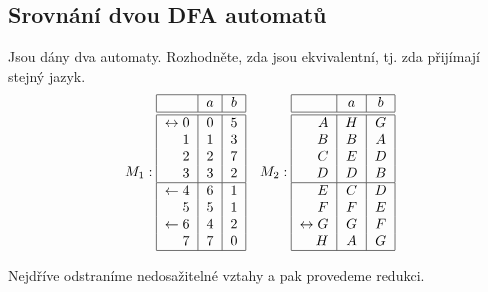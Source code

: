 \subsection{Srovnání dvou DFA automatů}
Jsou dány dva automaty. Rozhodněte, zda jsou ekvivalentní, tj. zda přijímají stejný jazyk.
\[
M_1:
\begin{tabular}{|r|c|c|}
    \hline
    & $a$ & $b$\\
    \hline
    \hline
    $\leftrightarrow 0$& $0$ & $5$\\
    $1$                & $1$ & $3$\\
    $2$                & $2$ & $7$\\
    $3$                & $3$ & $2$\\
    \hline
    $\leftarrow 4$     & $6$ & $1$\\
    $5$                & $5$ & $1$\\
    $\leftarrow 6$     & $4$ & $2$\\
    $7$                & $7$ & $0$\\
    \hline
\end{tabular}
\quad
M_2:
\begin{tabular}{|r|c|c|}
    \hline
    & $a$ & $b$\\
    \hline
    \hline
    $A$                & $H$ & $G$\\
    $B$                & $B$ & $A$\\
    $C$                & $E$ & $D$\\
    $D$                & $D$ & $B$\\
    \hline
    $E$                & $C$ & $D$\\
    $F$                & $F$ & $E$\\
    $\leftrightarrow G$& $G$ & $F$\\
    $H$                & $A$ & $G$\\
    \hline
\end{tabular}
\]

Nejdříve odstraníme nedosažitelné vztahy a pak provedeme redukci. 


